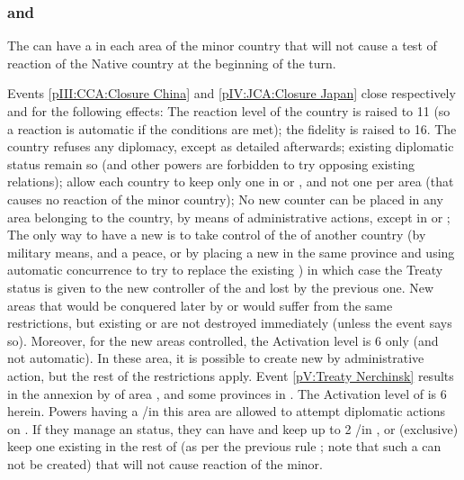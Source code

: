 \subsubsection{\paysJapon and \paysChina}\label{chDiplo:Diplo-japon}\label{chDiplo:Diplo-chine}
\aparag The \MAJ can have a \TP in each area of the minor country that
will not cause a test of reaction of the Native country at the beginning
of the turn.

 Events \ref{pIII:CCA:Closure China}
and \ref{pIV:JCA:Closure Japan} close respectively \paysChine and
\paysJapon for the following effects:
\bparag The reaction level of the country is raised to 11 (so a reaction
is automatic if the conditions are met); the fidelity is raised to 16.
\bparag The country refuses any diplomacy, except as detailed
afterwards; existing diplomatic status remain so (and other powers are
forbidden to try opposing existing relations);
\bparag \dipAT allow each country to keep only one \TP in \paysChine or
\paysJapon, and not one per area (that \TP causes no reaction of the
minor country);
\bparag No new \TP counter can be placed in any area belonging to the
country, by means of administrative actions, except in
\granderegionFormose or \granderegionCoree;
\bparag The only way to have a new \TP is to take control of the \TP of
another country (by military means, and a peace, or by placing a new \TP
in the same province and using automatic concurrence to try to replace
the existing \TP) in which case the Treaty status is given to the new
controller of the \TP and lost by the previous one.%
\bparag New areas that would be conquered later by \paysChine or
\paysJapon would suffer from the same restrictions, but existing \TP or
\COL are not destroyed immediately (unless the event says so).
Moreover, for the new areas controlled, the Activation level is 6 only
(and not automatic). In these area, it is possible to create new \TP by
administrative action, but the rest of the restrictions apply.
 Event \ref{pV:Treaty Nerchinsk} results in
the annexion by \paysChine of area \granderegionAmour, and some
provinces in \granderegionBaikal.
\bparag The Activation level of \paysChine is 6 herein.
\bparag Powers having a \COL/\TP in this area are allowed to attempt
diplomatic actions on \paysChine. If they manage an \dipAT status, they
can have and keep up to 2 \COL/\TP in \granderegionAmour, or (exclusive)
keep one existing in the rest of \paysChine (as per the previous rule ;
note that such a \TP can not be created) that will not cause reaction of
the minor.

